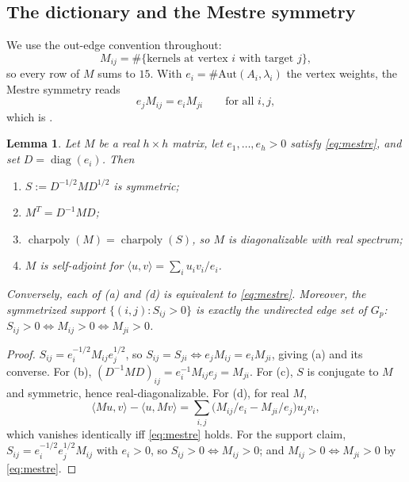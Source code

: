 \documentclass[11pt]{amsart}
\theoremstyle{plain}
\newtheorem{lemma}[theorem]{Lemma}
\theoremstyle{definition}
\newcommand{\Aut}{\mathrm{Aut}}
\DeclareMathOperator{\charp}{charpoly}
\DeclareMathOperator{\diag}{diag}
\providecommand{\charp}{\operatorname{charpoly}}
\begin{document}
	\subsection{The dictionary and the Mestre symmetry}
	\label{ss:dictionary}
	
	We use the out-edge convention throughout:
	\begin{equation}\label{eq:out-edge}
		M_{ij}=\#\{\text{kernels at vertex $i$ with target $j$}\},
	\end{equation}
	so every row of $M$ sums to $15$. With $e_i=\#\Aut(A_i,\lambda_i)$ the
	vertex weights, the Mestre symmetry reads
	\begin{equation}\label{eq:mestre}
		e_jM_{ij}=e_iM_{ji}\qquad\text{for all }i,j,
	\end{equation}
	which is \cite[Thm.~18(c)]{JordanZaytman}.
	
	\begin{lemma}\label{lem:mestre}
		Let $M$ be a real $h\times h$ matrix, let $e_1,\ldots,e_h>0$ satisfy
		\eqref{eq:mestre}, and set $D=\diag(e_i)$. Then
		\begin{enumerate}[label=\textup{(\alph*)},leftmargin=2.2em]
			\item $S:=D^{-1/2}MD^{1/2}$ is symmetric;
			\item $M^{T}=D^{-1}MD$;
			\item $\charp(M)=\charp(S)$, so $M$ is diagonalizable with real spectrum;
			\item $M$ is self-adjoint for
			$\langle u,v\rangle=\sum_i u_iv_i/e_i$.
		\end{enumerate}
		Conversely, each of \textup{(a)} and \textup{(d)} is equivalent to
		\eqref{eq:mestre}. Moreover, the symmetrized support
		$\{(i,j):S_{ij}>0\}$ is exactly the undirected edge set of $G_p$:
		$S_{ij}>0\iff M_{ij}>0\iff M_{ji}>0$.
	\end{lemma}
	
	\begin{proof}
		$S_{ij}=e_i^{-1/2}M_{ij}e_j^{1/2}$, so $S_{ij}=S_{ji}\iff
		e_jM_{ij}=e_iM_{ji}$, giving (a) and its converse. For (b),
		$(D^{-1}MD)_{ij}=e_i^{-1}M_{ij}e_j=M_{ji}$. For (c), $S$ is conjugate to
		$M$ and symmetric, hence real-diagonalizable. For (d), for real $M$,
		\[
		\langle Mu,v\rangle-\langle u,Mv\rangle
		=\sum_{i,j}\bigl(M_{ij}/e_i-M_{ji}/e_j\bigr)u_jv_i,
		\]
		which vanishes identically iff \eqref{eq:mestre} holds. For the support
		claim, $S_{ij}=e_i^{-1/2}e_j^{1/2}M_{ij}$ with $e_i>0$, so
		$S_{ij}>0\iff M_{ij}>0$; and $M_{ij}>0\iff M_{ji}>0$ by \eqref{eq:mestre}.
	\end{proof}
	
\end{document}
